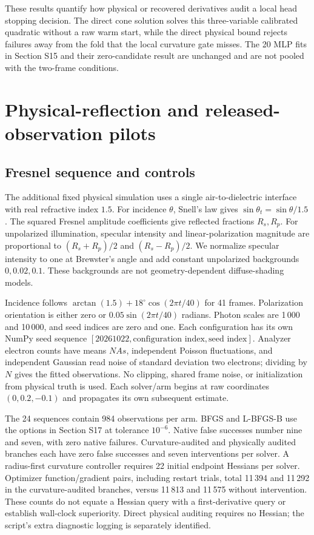 \documentclass[10pt,a4paper]{article}
\begin{document}
These results quantify how physical or recovered derivatives audit a local head stopping decision. The direct cone solution solves this three-variable calibrated quadratic without a raw warm start, while the direct physical bound rejects failures away from the fold that the local curvature gate misses. The 20 MLP fits in Section S15 and their zero-candidate result are unchanged and are not pooled with the two-frame conditions.

\section{Physical-reflection and released-observation pilots}
\label{sec:realprotocol}
\subsection{Fresnel sequence and controls}
The additional fixed physical simulation uses a single air-to-dielectric interface with real refractive index $1.5$. For incidence $\theta$, Snell's law gives $\sin\theta_t=\sin\theta/1.5$. The squared Fresnel amplitude coefficients give reflected fractions $R_s,R_p$. For unpolarized illumination, specular intensity and linear-polarization magnitude are proportional to $(R_s+R_p)/2$ and $(R_s-R_p)/2$. We normalize specular intensity to one at Brewster's angle and add constant unpolarized backgrounds $0,0.02,0.1$. These backgrounds are not geometry-dependent diffuse-shading models.

Incidence follows $\arctan(1.5)+18^{\circ}\cos(2\pi t/40)$ for 41 frames. Polarization orientation is either zero or $0.05\sin(2\pi t/40)$ radians. Photon scales are 1\,000 and 10\,000, and seed indices are zero and one. Each configuration has its own NumPy seed sequence $[20261022,\text{configuration index},\text{seed index}]$. Analyzer electron counts have means $NAs$, independent Poisson fluctuations, and independent Gaussian read noise of standard deviation two electrons; dividing by $N$ gives the fitted observations. No clipping, shared frame noise, or initialization from physical truth is used. Each solver/arm begins at raw coordinates $(0,0.2,-0.1)$ and propagates its own subsequent estimate.

The 24 sequences contain 984 observations per arm. BFGS and L-BFGS-B use the options in Section S17 at tolerance $10^{-6}$. Native false successes number nine and seven, with zero native failures. Curvature-audited and physically audited branches each have zero false successes and seven interventions per solver. A radius-first curvature controller requires 22 initial endpoint Hessians per solver. Optimizer function/gradient pairs, including restart trials, total 11\,394 and 11\,292 in the curvature-audited branches, versus 11\,813 and 11\,575 without intervention. These counts do not equate a Hessian query with a first-derivative query or establish wall-clock superiority. Direct physical auditing requires no Hessian; the script's extra diagnostic logging is separately identified.
\end{document}
